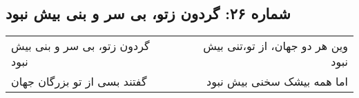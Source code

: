 \begin{center}
\section*{شماره ۲۶: گردون زتو، بی سر و بنی بیش نبود}
\label{sec:026}
\begin{longtable}{l p{0.5cm} r}
گردون زتو، بی سر و بنی بیش نبود
&&
وین هر دو جهان، از تو،‌تنی بیش نبود
\\
گفتند بسی از تو بزرگان جهان
&&
اما همه بیشک سخنی بیش نبود
\\
\end{longtable}
\end{center}
